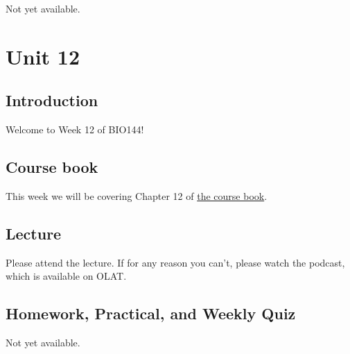 \documentclass[
  letterpaper,
  8pt,
  a4paper]{book}
\begin{document}

Not yet available.


\chapter*{Unit 12}\label{unit-12}


\section*{Introduction}\label{introduction-12}


Welcome to Week 12 of BIO144!

\section*{Course book}\label{course-book-11}


This week we will be covering Chapter 12 of
\href{https://opetchey.github.io/BIO144_Course_Book/}{the course book}.

\section*{Lecture}\label{lecture-11}


Please attend the lecture. If for any reason you can't, please watch the
podcast, which is available on OLAT.

\section*{Homework, Practical, and Weekly
Quiz}\label{homework-practical-and-weekly-quiz-11}


Not yet available.


\backmatter
\end{document}

